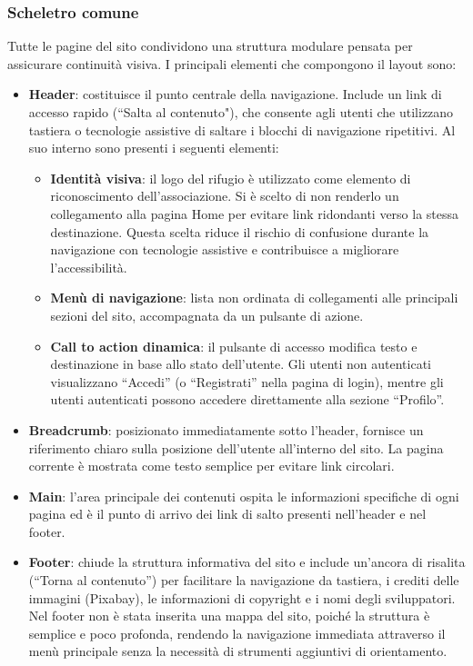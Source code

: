 \documentclass[10pt, letterpaper]{article}
\begin{document}
\subsubsection{Scheletro comune}
Tutte le pagine del sito condividono una struttura modulare pensata per assicurare continuità visiva. I principali elementi che compongono il layout sono:
\begin{itemize}
    \item \textbf{Header}: costituisce il punto centrale della navigazione. Include un link di accesso rapido (“Salta al contenuto"), che consente agli utenti che utilizzano tastiera o tecnologie assistive di saltare i blocchi di navigazione ripetitivi. Al suo interno sono presenti i seguenti elementi:
    \begin{itemize}
        \item \textbf{Identità visiva}: il logo del rifugio è utilizzato come elemento di riconoscimento dell’associazione. Si è scelto di non renderlo un collegamento alla pagina Home per evitare link ridondanti verso la stessa destinazione.
        Questa scelta riduce il rischio di confusione durante la navigazione con tecnologie assistive e contribuisce a migliorare l’accessibilità.
        \item \textbf{Menù di navigazione}: lista non ordinata di collegamenti alle principali sezioni del sito, accompagnata da un pulsante di azione.
        \item \textbf{Call to action dinamica}: il pulsante di accesso modifica testo e destinazione in base allo stato dell’utente. Gli utenti non autenticati visualizzano “Accedi'' (o “Registrati'' nella pagina di login), mentre gli utenti autenticati possono accedere direttamente alla sezione “Profilo''.
    \end{itemize}
    \item \textbf{Breadcrumb}: posizionato immediatamente sotto l’header, fornisce un riferimento chiaro sulla posizione dell’utente all’interno del sito. La pagina corrente è mostrata come testo semplice per evitare link circolari.
    \item \textbf{Main}: l’area principale dei contenuti ospita le informazioni specifiche di ogni pagina ed è il punto di arrivo dei link di salto presenti nell’header e nel footer.
    \item \textbf{Footer}: chiude la struttura informativa del sito e include un’ancora di risalita (“Torna al contenuto'') per facilitare la navigazione da tastiera, i crediti delle immagini (Pixabay), le informazioni di copyright e i nomi degli sviluppatori. Nel footer non è stata inserita una mappa del sito, poiché la struttura è semplice e poco profonda, rendendo la navigazione immediata attraverso il menù principale senza la necessità di strumenti aggiuntivi di orientamento.
\end{itemize}
\end{document}
